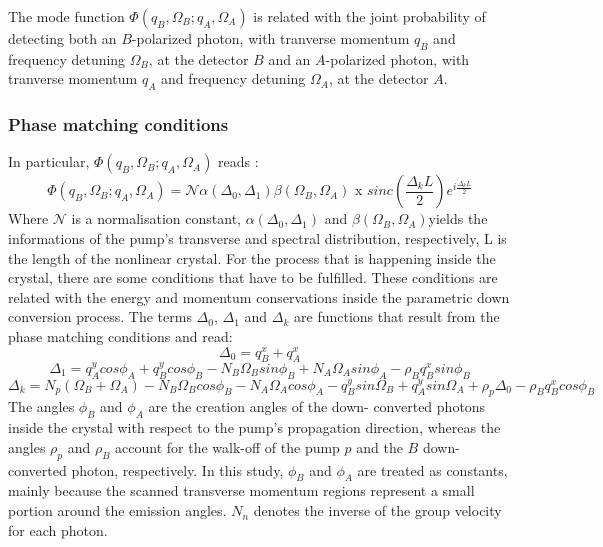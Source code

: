 The mode function  $\Phi(q_B,\Omega_B;q_A,\Omega_A)$ is related with the joint probability of detecting both an $B$-polarized
photon, with tranverse momentum $q_B$ and frequency detuning $\Omega_B$, at the detector $B$ 
and an $A$-polarized
photon, with tranverse momentum $q_A$ and frequency detuning $\Omega_A$, at the detector $A$. 

\subsubsection{Phase matching conditions}
In particular, $\Phi(q_B,\Omega_B;q_A,\Omega_A)$ reads \cite{spatiocorrelations}:
\begin{equation}
\label{eq:mode}
\Phi(q_B,\Omega_B;q_A,\Omega_A) = \mathcal{N} \alpha(\Delta_0,\Delta_1) \beta(\Omega_B,\Omega_A) \text{ x }
sinc \left( \frac{\Delta_k L}{2} \right) e^{i \frac{\Delta_k L}{2}}
\end{equation}
Where $\mathcal{N}$ is a normalisation constant, $\alpha(\Delta_0,\Delta_1)$
and $\beta(\Omega_B,\Omega_A)$yields the informations of the pump's transverse 
and spectral distribution, respectively, L is the length of the nonlinear crystal.
For the process that is happening inside the crystal, there are some conditions that have to be fulfilled. These conditions are related with the energy and momentum conservations inside the parametric down conversion process.
The terms $\Delta_0$, $\Delta_1$ and $\Delta_k$ are functions that result from the phase matching conditions and read:
\begin{equation}
\Delta_0=q_B^x + q_A^x
\end{equation}
\begin{equation}
\Delta_1= q_A^y cos\phi_A + q_B^y cos\phi_B - N_B \Omega_B sin\phi_B + N_A \Omega_A sin\phi_A - \rho_B q_B^x sin\phi_B 
\end{equation}
\begin{equation}
\Delta_k=N_p(\Omega_B+\Omega_A)-N_B\Omega_B cos\phi_B - N_A\Omega_A cos\phi_A -q_B^y sin\Omega_B + q_A^y sin\Omega_A + \rho_p \Delta_0 - \rho_B q_B^x cos\phi_B
\end{equation}
The angles $\phi_B$ and $\phi_A$ are the creation angles of the down-
converted photons inside the crystal with respect to the pump’s
propagation direction, whereas the angles $\rho_p$ and $\rho_B$ account for
the walk-off of the pump $p$ and the $B$ down-
converted photon, respectively. 
In this study, $\phi_B$ and $\phi_A$ are treated as constants, 
mainly because the scanned transverse momentum regions represent a small portion around
the emission angles. $N_n$ denotes the inverse of the group velocity for each photon.



